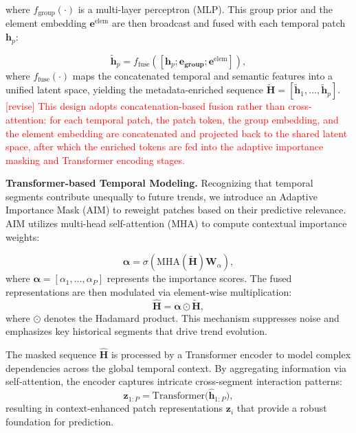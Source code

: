 \documentclass[Afour,sageh,times]{sagej}
\newcommand{\zhang}[1]{\textcolor{red}{[revise] #1}}
\begin{document}
{where $f_{\text{group}}(\cdot)$ is a multi-layer perceptron (MLP). This group prior and the element embedding $\mathbf{e}^{\text{elem}}$ are then broadcast and fused with each temporal patch $\mathbf{h}_p$:

\begin{equation}
\mathbf{\tilde{h}}_p = f_\text{fuse}([\mathbf{h}_p; \mathbf{e_\text{group}}; \mathbf{e}^{\text{elem}}]),\end{equation}
where $f_{\text{fuse}}(\cdot)$ maps the concatenated temporal and semantic features into a unified latent space, yielding the metadata-enriched sequence $\mathbf{\tilde{H}} = [\mathbf{\tilde{h}}_1, \dots, \mathbf{\tilde{h}}_p]$.
\zhang{This design adopts concatenation-based fusion rather than cross-attention: for each temporal patch, the patch token, the group embedding, and the element embedding are concatenated and projected back to the shared latent space, after which the enriched tokens are fed into the adaptive importance masking and Transformer encoding stages.}


\textbf{Transformer-based Temporal Modeling.} Recognizing that temporal segments contribute unequally to future trends, we introduce an Adaptive Importance Mask (AIM) to reweight patches based on their predictive relevance. AIM utilizes multi-head self-attention (MHA) to compute contextual importance weights:

\begin{equation}
\boldsymbol{\alpha} = \sigma\left( \text{MHA}(\mathbf{\tilde{H}}) \mathbf{W}_\alpha \right),
\end{equation}
where $\boldsymbol{\alpha} = [\alpha_1, \dots, \alpha_P]$ represents the importance scores. The fused representations are then modulated via element-wise multiplication:
\begin{equation}
\mathbf{\hat{H}} = \boldsymbol{\alpha} \odot \mathbf{\tilde{H}},
\end{equation}
where $\odot$ denotes the Hadamard product. This mechanism suppresses noise and emphasizes key historical segments that drive trend evolution.

The masked sequence $\mathbf{\hat{H}}$ is processed by a Transformer encoder to model complex dependencies across the global temporal context. By aggregating information via self-attention, the encoder captures intricate cross-segment interaction patterns:
\begin{equation}
\mathbf{z}_{1:P} = \mathrm{Transformer}\big(\mathbf{\hat{h}}_{1:P}\big),
\end{equation}
resulting in context-enhanced patch representations $\mathbf{z}_i$ that provide a robust foundation for prediction.

}
\end{document}
